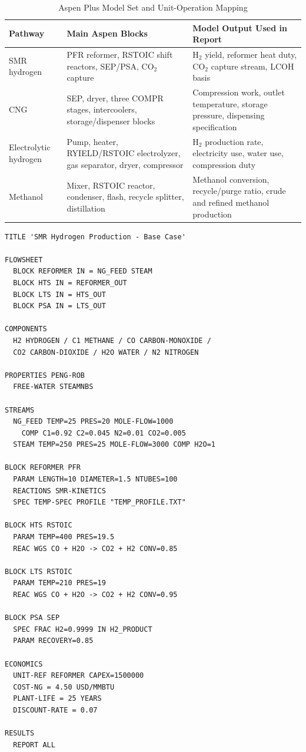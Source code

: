 \documentclass[12pt,twoside,openany]{book}
\begin{document}
\begin{table}[htbp]
    \centering
    \caption{Aspen Plus Model Set and Unit-Operation Mapping}
    \label{tab:aspen_model_set}
    \begin{tabular}{L{3cm} L{4.2cm} L{5.5cm}}
    \hline
    \textbf{Pathway} & \textbf{Main Aspen Blocks} & \textbf{Model Output Used in Report} \\
    \hline
    SMR hydrogen & PFR reformer, RSTOIC shift reactors, SEP/PSA, CO$_2$ capture & H$_2$ yield, reformer heat duty, CO$_2$ capture stream, LCOH basis \\
    CNG & SEP, dryer, three COMPR stages, intercoolers, storage/dispenser blocks & Compression work, outlet temperature, storage pressure, dispensing specification \\
    Electrolytic hydrogen & Pump, heater, RYIELD/RSTOIC electrolyzer, gas separator, dryer, compressor & H$_2$ production rate, electricity use, water use, compression duty \\
    Methanol & Mixer, RSTOIC reactor, condenser, flash, recycle splitter, distillation & Methanol conversion, recycle/purge ratio, crude and refined methanol production \\
    \hline
    \end{tabular}
\end{table}

\begin{lstlisting}[language={}, caption={SMR\_BaseCase.apw}, label=lst:smr_apw]
TITLE 'SMR Hydrogen Production - Base Case'

FLOWSHEET
  BLOCK REFORMER IN = NG_FEED STEAM
  BLOCK HTS IN = REFORMER_OUT
  BLOCK LTS IN = HTS_OUT
  BLOCK PSA IN = LTS_OUT

COMPONENTS
  H2 HYDROGEN / C1 METHANE / CO CARBON-MONOXIDE /
  CO2 CARBON-DIOXIDE / H2O WATER / N2 NITROGEN

PROPERTIES PENG-ROB
  FREE-WATER STEAMNBS

STREAMS
  NG_FEED TEMP=25 PRES=20 MOLE-FLOW=1000
    COMP C1=0.92 C2=0.045 N2=0.01 CO2=0.005
  STEAM TEMP=250 PRES=25 MOLE-FLOW=3000 COMP H2O=1

BLOCK REFORMER PFR
  PARAM LENGTH=10 DIAMETER=1.5 NTUBES=100
  REACTIONS SMR-KINETICS
  SPEC TEMP-SPEC PROFILE "TEMP_PROFILE.TXT"

BLOCK HTS RSTOIC
  PARAM TEMP=400 PRES=19.5
  REAC WGS CO + H2O -> CO2 + H2 CONV=0.85

BLOCK LTS RSTOIC
  PARAM TEMP=210 PRES=19
  REAC WGS CO + H2O -> CO2 + H2 CONV=0.95

BLOCK PSA SEP
  SPEC FRAC H2=0.9999 IN H2_PRODUCT
  PARAM RECOVERY=0.85

ECONOMICS
  UNIT-REF REFORMER CAPEX=1500000
  COST-NG = 4.50 USD/MMBTU
  PLANT-LIFE = 25 YEARS
  DISCOUNT-RATE = 0.07

RESULTS
  REPORT ALL
\end{lstlisting}
\end{document}
